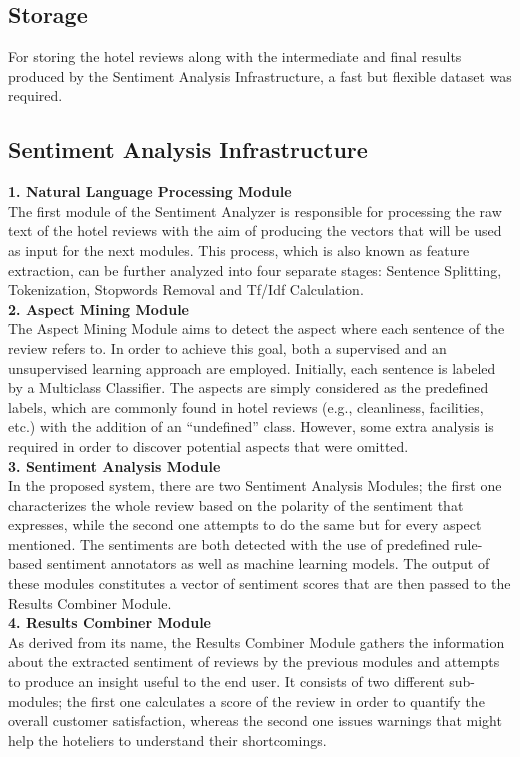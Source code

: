 \documentclass[a4paper, 12pt]{report}
\begin{document}
\subsection{Storage}
For storing the hotel reviews along with the intermediate and final results produced by the Sentiment Analysis Infrastructure, a fast but flexible dataset was required.
\subsection{Sentiment Analysis Infrastructure}
\textbf{1. Natural Language Processing Module}\\
The first module of the Sentiment Analyzer is responsible for processing the raw text of the hotel reviews with the aim of producing the vectors that will be used as input for the next modules. This process, which is also known as feature extraction, can be further analyzed into four separate stages: Sentence Splitting, Tokenization, Stopwords Removal and Tf/Idf Calculation.\\
\textbf{2. Aspect Mining Module}\\
The Aspect Mining Module aims to detect the aspect where each sentence of the review refers to. In order to achieve this goal, both a supervised and an unsupervised learning approach are employed. Initially, each sentence is labeled by a Multiclass Classifier. The aspects are simply considered as the predefined labels, which are commonly found in hotel reviews (e.g., cleanliness, facilities, etc.) with the addition of an “undefined” class. However, some extra analysis is required in order to discover potential aspects that were omitted.\\
\textbf{3. Sentiment Analysis Module}\\
In the proposed system, there are two Sentiment Analysis Modules; the first one characterizes the whole review based on the polarity of the sentiment that expresses, while the second one attempts to do the same but for every aspect mentioned. The sentiments are both detected with the use of predefined rule-based sentiment annotators as well as machine learning models. The output of these modules constitutes a vector of sentiment scores that are then passed to the Results Combiner Module.\\
\textbf{4. Results Combiner Module}\\
As derived from its name, the Results Combiner Module gathers the information about the extracted sentiment of reviews by the previous modules and attempts to produce an insight useful to the end user. It consists of two different sub-modules; the first one calculates a score of the review in order to quantify the overall customer satisfaction, whereas the second one issues warnings that might help the hoteliers to understand their shortcomings. 
\end{document}
